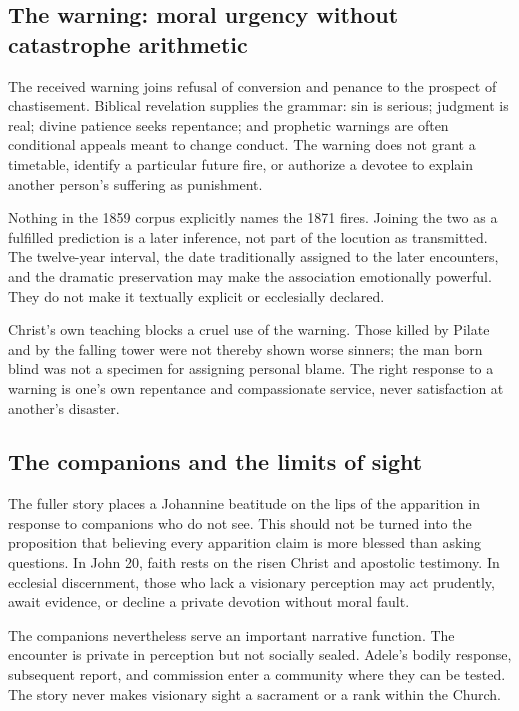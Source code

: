 \subsection{The warning: moral urgency without catastrophe arithmetic}

The received warning joins refusal of conversion and penance to the prospect of chastisement. Biblical revelation supplies the grammar: sin is serious; judgment is real; divine patience seeks repentance; and prophetic warnings are often conditional appeals meant to change conduct. The warning does not grant a timetable, identify a particular future fire, or authorize a devotee to explain another person's suffering as punishment.

Nothing in the 1859 corpus explicitly names the 1871 fires. Joining the two as a fulfilled prediction is a later inference, not part of the locution as transmitted. The twelve-year interval, the date traditionally assigned to the later encounters, and the dramatic preservation may make the association emotionally powerful. They do not make it textually explicit or ecclesially declared.

Christ's own teaching blocks a cruel use of the warning. Those killed by Pilate and by the falling tower were not thereby shown worse sinners; the man born blind was not a specimen for assigning personal blame. The right response to a warning is one's own repentance and compassionate service, never satisfaction at another's disaster.

\subsection{The companions and the limits of sight}

The fuller story places a Johannine beatitude on the lips of the apparition in response to companions who do not see. This should not be turned into the proposition that believing every apparition claim is more blessed than asking questions. In John 20, faith rests on the risen Christ and apostolic testimony. In ecclesial discernment, those who lack a visionary perception may act prudently, await evidence, or decline a private devotion without moral fault.

The companions nevertheless serve an important narrative function. The encounter is private in perception but not socially sealed. Adele's bodily response, subsequent report, and commission enter a community where they can be tested. The story never makes visionary sight a sacrament or a rank within the Church.

